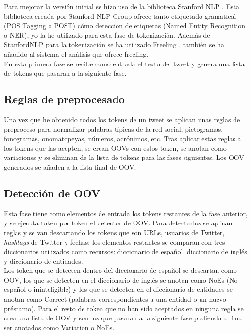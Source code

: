 \documentclass[spanish,12pt, a4paper,twoside]{paper}
\begin{document}
Para mejorar la versión inicial se hizo uso de la biblioteca Stanford NLP \cite{stanfordnlp}. Esta biblioteca creada por Stanford NLP Group ofrece tanto etiquetado gramatical (POS Tagging o POST) cómo deteccion de etiquetas (Named Entity Recognition o NER), yo la he utilizado para esta fase de tokenización. Además de StanfordNLP para la tokenización se ha utilizado Freeling \cite{freeling}, también se ha añadido al sistema el análisis que ofrece freeling.\\

En esta primera fase se recibe como entrada el texto del tweet y genera una lista de tokens que pasaran a la siguiente fase.

\subsection{Reglas de preprocesado}\label{sec:reglasdepreprocesado}
Una vez que he obtenido todos los tokens de un tweet se aplican unas reglas de preproceso para normalizar palabras típicas de la red social, pictogramas, fonogramas, onomatopeyas, números, acrónimos, etc. Tras aplicar estas reglas a los tokens que las acepten, se crean OOVs con estos token, se anotan como variaciones y se eliminan de la lista de tokens para las fases siguientes. Los OOV generados se añaden a la lista final de OOV.

\subsection{Detección de OOV}\label{sec:detecciondeoov}
Esta fase tiene como elementos de entrada los tokens restantes de la fase anterior, y se ejecuta token por token el detector de OOV. Para detectarlos se aplican reglas y se van descartando los tokens que son URLs, usuarios de Twitter, \textit{hashtags} de Twitter y fechas; los elementos restantes se comparan con tres diccionarios utilizados como recursos: diccionario de español, diccionario de inglés y diccionario de entidades.\\

Los token que se detecten dentro del diccionario de español se descartan como OOV, los que se detecten en el diccionario de inglés se anotan como NoEs (No español o ininteligible) y los que se detecten en el diccionario de entidades se anotan como Correct (palabras correspondientes a una entidad o un nuevo préstamo). Para el resto de token que no han sido aceptados en ninguna regla se crea una lista de OOV y son los que pasaran a la siguiente fase pudiendo al final ser anotados como Variation o NoEs.
\end{document}
